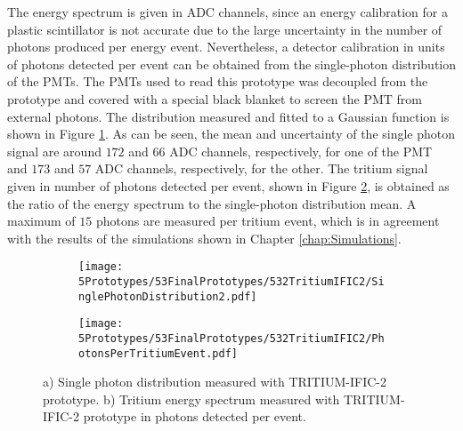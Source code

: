 The energy spectrum is given in ADC channels, since an energy calibration for a plastic scintillator is not accurate due to the large uncertainty in the number of photons produced per energy event. Nevertheless, a detector calibration in units of photons detected per event can be obtained from the single-photon distribution of the PMTs. The PMTs used to read this prototype was decoupled from the prototype and covered with a special black blanket to screen the PMT from external photons. The distribution measured and fitted to a Gaussian function is shown in Figure \ref{subfig:SinglePhotonDistributionIFIC2}. As can be seen, the mean and uncertainty of the single photon signal are around $172$ and $66$ ADC channels, respectively, for one of the PMT and $173$ and $57$ ADC channels, respectively, for the other. The tritium signal given in number of photons detected per event, shown in Figure \ref{subfig:TritiumSignalTRITIUMIFIC2}, is obtained as the ratio of the energy spectrum to the single-photon distribution mean. A maximum of $15$ photons are measured per tritium event, which is in agreement with the results of the simulations shown in Chapter \ref{chap:Simulations}. 

\begin{figure}
\centering
    \begin{subfigure}[b]{0.73\textwidth}
    \centering
    \texttt{[image: 5Prototypes/53FinalPrototypes/532TritiumIFIC2/SinglePhotonDistribution2.pdf]}  
    \caption{\label{subfig:SinglePhotonDistributionIFIC2}}
    \end{subfigure}
    \hfill
    \begin{subfigure}[b]{0.73\textwidth}
    \centering
    \texttt{[image: 5Prototypes/53FinalPrototypes/532TritiumIFIC2/PhotonsPerTritiumEvent.pdf]}  
    \caption{\label{subfig:TritiumSignalTRITIUMIFIC2}}
    \end{subfigure}
 \caption{a) Single photon distribution measured with TRITIUM-IFIC-2 prototype. b) Tritium energy spectrum measured with TRITIUM-IFIC-2 prototype in photons detected per event.}
 \label{fig:PhotonsPerTritiumEventIFIC2}
\end{figure}


